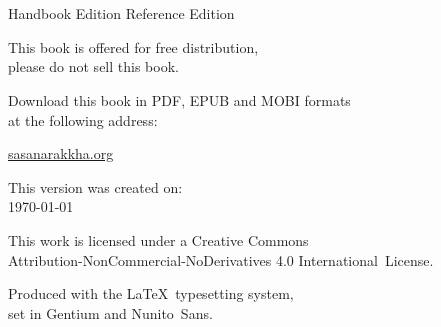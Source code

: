 \cleartoverso
\thispagestyle{empty}

\vspace*{-\baselineskip}

{%

\ifhandbookedition
\fontsize{9}{10}\selectfont
\else
\fontsize{9}{11}\selectfont
\fi
\centering
\setlength{\parindent}{0pt}%
\setlength{\parskip}{0.8\baselineskip}%

\thetitle\\
\thesubtitle\\
\ifhandbookedition
Handbook Edition
\else
Reference Edition
\fi

This book is offered for free distribution,\\
please do not sell this book.

Download this book in PDF, EPUB and MOBI formats\\
at the following address:

\href{https://sasanarakkha.org/}{sasanarakkha.org}

\vfill

This version was created on:\\
\today

\vfill

This work is licensed under a Creative Commons\\
Attribution-NonCommercial-NoDerivatives 4.0 International~License.

Produced with the \LaTeX\ typesetting system,\\
set in Gentium and Nunito~Sans.

\theEditionInfo

}
